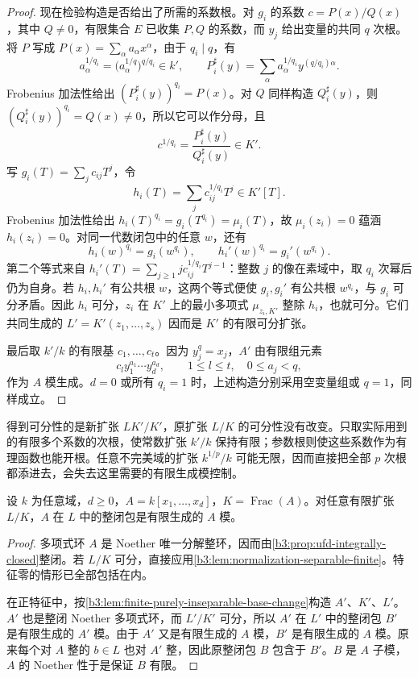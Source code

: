\begin{proof}
	现在检验构造是否给出了所需的系数根。对 \(g_i\) 的系数 \(c=P(x)/Q(x)\)，其中 \(Q\ne0\)，有限集合 \(E\) 已收集 \(P,Q\) 的系数，而 \(y_j\) 给出变量的共同 \(q\) 次根。将 \(P\) 写成 \(P(x)=\sum_\alpha a_\alpha x^\alpha\)，由于 \(q_i\mid q\)，有
	\[
		a_\alpha^{1/q_i} =\bigl(a_\alpha^{1/q}\bigr)^{q/q_i}\in k', \qquad P_i^\sharp(y) =\sum_\alpha a_\alpha^{1/q_i}y^{(q/q_i)\alpha}.
	\]
	Frobenius 加法性给出 \((P_i^\sharp(y))^{q_i}=P(x)\)。对 \(Q\) 同样构造 \(Q_i^\sharp(y)\)，则 \((Q_i^\sharp(y))^{q_i}=Q(x)\ne0\)，所以它可以作分母，且
	\[
		c^{1/q_i}=\dfrac{P_i^\sharp(y)}{Q_i^\sharp(y)}\in K'.
	\]
	写 \(g_i(T)=\sum_jc_{ij}T^j\)，令
	\[
		h_i(T)=\sum_jc_{ij}^{1/q_i}T^j\in K'[T].
	\]
	Frobenius 加法性给出 \(h_i(T)^{q_i}=g_i(T^{q_i})=\mu_i(T)\)，故 \(\mu_i(z_i)=0\) 蕴涵 \(h_i(z_i)=0\)。对同一代数闭包中的任意 \(w\)，还有
	\[
		h_i(w)^{q_i}=g_i(w^{q_i}),\qquad h_i'(w)^{q_i}=g_i'(w^{q_i}).
	\]
	第二个等式来自 \(h_i'(T)=\sum_{j\ge1}j c_{ij}^{1/q_i}T^{j-1}\)：整数 \(j\) 的像在素域中，取 \(q_i\) 次幂后仍为自身。若 \(h_i,h_i'\) 有公共根 \(w\)，这两个等式便使 \(g_i,g_i'\) 有公共根 \(w^{q_i}\)，与 \(g_i\) 可分矛盾。因此 \(h_i\) 可分，\(z_i\) 在 \(K'\) 上的最小多项式 \(\mu_{z_i,K'}\) 整除 \(h_i\)，也就可分。它们共同生成的 \(L'=K'(z_1,\ldots,z_s)\) 因而是 \(K'\) 的有限可分扩张。

	最后取 \(k'/k\) 的有限基 \(c_1,\ldots,c_t\)。因为 \(y_j^q=x_j\)，\(A'\) 由有限组元素
	\[
		c_l y_1^{a_1}\cdots y_d^{a_d}, \qquad 1\le l\le t,\quad 0\le a_j<q,
	\]
	作为 \(A\) 模生成。\(d=0\) 或所有 \(q_i=1\) 时，上述构造分别采用空变量组或 \(q=1\)，同样成立。
\end{proof}

得到可分性的是新扩张 \(LK'/K'\)，原扩张 \(L/K\) 的可分性没有改变。只取实际用到的有限多个系数的次根，使常数扩张 \(k'/k\) 保持有限；参数根则使这些系数作为有理函数也能开根。任意不完美域的扩张 \(k^{1/p}/k\) 可能无限，因而直接把全部 \(p\) 次根都添进去，会失去这里需要的有限生成模控制。

\begin{theorem}\label{b3:thm:polynomial-normalization-finite}
	设 \(k\) 为任意域，\(d\ge0\)，\(A=k[x_1,\ldots,x_d]\)，\(K=\operatorname{Frac}(A)\)。对任意有限扩张 \(L/K\)，\(A\) 在 \(L\) 中的整闭包是有限生成的 \(A\) 模。
\end{theorem}
\begin{proof}
	多项式环 \(A\) 是 Noether 唯一分解整环，因而由\cref{b3:prop:ufd-integrally-closed}整闭。若 \(L/K\) 可分，直接应用\cref{b3:lem:normalization-separable-finite}。特征零的情形已全部包括在内。

	在正特征中，按\cref{b3:lem:finite-purely-inseparable-base-change}构造 \(A'\)、\(K'\)、\(L'\)。\(A'\) 也是整闭 Noether 多项式环，而 \(L'/K'\) 可分，所以 \(A'\) 在 \(L'\) 中的整闭包 \(B'\) 是有限生成的 \(A'\) 模。由于 \(A'\) 又是有限生成的 \(A\) 模，\(B'\) 是有限生成的 \(A\) 模。原来每个对 \(A\) 整的 \(b\in L\) 也对 \(A'\) 整，因此原整闭包 \(B\) 包含于 \(B'\)。\(B\) 是 \(A\) 子模，\(A\) 的 Noether 性于是保证 \(B\) 有限。
\end{proof}

